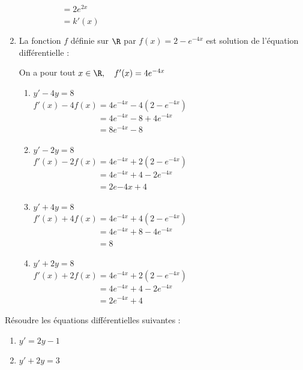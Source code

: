 \documentclass[a4paper,11pt,exos]{nsi} %
\begin{document}
\begin{enumerate}
{\begin{multicols}{2}
\begin{enumerate}[label=]
            $\phantom{2k(x)+2}=2e^{2x}$\\
            $\phantom{2k(x)+2}=k'(x)$
        \end{enumerate}
    \end{multicols}}
\newpage
    \item La fonction $f$ définie sur $\R$ par $f(x)=2-e^{-4x}$ est solution de l'équation différentielle :\\
    \textcolor{UGLiBlue}{
        On a pour tout $x\in\R, \quad f'(x)=4e^{-4x}$
    \begin{multicols}{2}
        \begin{enumerate}[label=]
            \item {} $y'-4y=8$\\[.5em]
            $f'(x)-4f(x)=4e^{-4x}-4(2-e^{-4x})$\\
            $\phantom{f'(x)-4f(x)}=4e^{-4x}-8+4e^{-4x}$\\
            $\phantom{f'(x)-4f(x)}=8e^{-4x}-8$
            \item {} $y'-2y=8$\\[.5em]
            $f'(x)-2f(x)=4e^{-4x}+2(2-e^{-4x})$\\
            $\phantom{f'(x)-2f(x)}=4e^{-4x}+4-2e^{-4x}$\\
            $\phantom{f'(x)-2f(x)}=2e{-4x}+4$
            \item {} $y'+4y=8$\\[.5em]
            $f'(x)+4f(x)=4e^{-4x}+4(2-e^{-4x})$\\
            $\phantom{f'(x)+4f(x)}=4e^{-4x}+8-4e^{-4x}$\\
            $\phantom{f'(x)+4f(x)}=8$
            \item {} $y'+2y=8$\\[.5em]
            $f'(x)+2f(x)=4e^{-4x}+2(2-e^{-4x})$\\
            $\phantom{f'(x)+2f(x)}=4e^{-4x}+4-2e^{-4x}$\\
            $\phantom{f'(x)+2f(x)}=2e^{-4x}+4$
        \end{enumerate}
    \end{multicols}}
\end{enumerate}


\exo{}
Résoudre les équations différentielles suivantes :
\begin{multicols}{2}
    \begin{enumerate}
        \item $y'=2y-1$
        \item $y'+2y=3$
    \end{enumerate}
\end{multicols}
\end{document}
